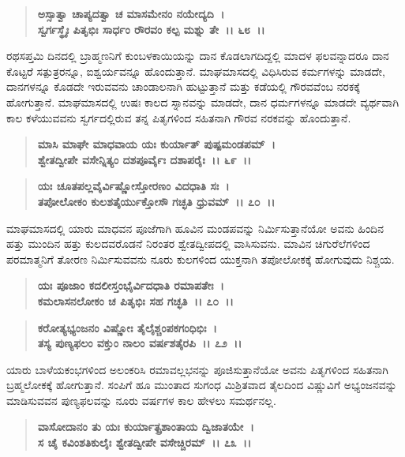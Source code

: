 \begin{verse}
\textbf{ಅಸ್ಸಾತ್ವಾ ಚಾಪ್ಯದತ್ವಾ ಚ ಮಾಸಮೇನಂ ನಯೇದ್ಯದಿ~।}\\\textbf{ಸ್ವರ್ಗಸ್ಥೈಃ ಪಿತೃಭಿಃ ಸಾರ್ಧಂ ರೌರವಂ ಕಲ್ಪ ಮಶ್ನು ತೇ~।। ೬೮~।।}
\end{verse}

ರಥಸಪ್ತಮಿ ದಿನದಲ್ಲಿ ಬ್ರಾಹ್ಮಣನಿಗೆ ಕುಂಬಳಕಾಯಿಯನ್ನು ದಾನ ಕೊಡಲಾಗದಿದ್ದಲ್ಲಿ ಮಾದಳ ಫಲವನ್ನಾದರೂ ದಾನ ಕೊಟ್ಟರೆ ಸತ್ಪುತ್ರರನ್ನೂ, ಐಶ್ವರ್ಯವನ್ನೂ ಹೊಂದುತ್ತಾನೆ. ಮಾಘಮಾಸದಲ್ಲಿ ವಿಧಿಸಿರುವ ಕರ್ಮಗಳನ್ನು ಮಾಡದೇ, ದಾನಗಳನ್ನೂ ಕೊಡದೇ ಇರುವವನು ಚಾಂಡಾಲನಾಗಿ ಹುಟ್ಟುತ್ತಾನೆ ಮತ್ತು ಕಡೆಯಲ್ಲಿ ಗೌರವವೆಂಬ ನರಕಕ್ಕೆ ಹೋಗುತ್ತಾನೆ. ಮಾಘಮಾಸದಲ್ಲಿ ಉಷಃ ಕಾಲದ ಸ್ನಾನವನ್ನು ಮಾಡದೇ, ದಾನ ಧರ್ಮಗಳನ್ನೂ ಮಾಡದೇ ವ್ಯರ್ಥವಾಗಿ ಕಾಲ ಕಳೆಯುವವನು ಸ್ವರ್ಗದಲ್ಲಿರುವ ತನ್ನ ಪಿತೃಗಳಿಂದ ಸಹಿತನಾಗಿ ಗೌರವ ನರಕವನ್ನು ಹೊಂದುತ್ತಾನೆ.

\begin{verse}
\textbf{ಮಾಸಿ ಮಾಘೇ ಮಾಧವಾಯ ಯಃ ಕುರ್ಯಾತ್ ಪುಷ್ಪಮಂಡಪಮ್~।}\\\textbf{ಶ್ವೇತದ್ವೀಪೇ ವಸೇನ್ನಿತ್ಯಂ ದಶಪೂರ್ವೈಃ ದಶಾಪರೈಃ~।। ೬೯~।।}
\end{verse}

\begin{verse}
\textbf{ಯಃ ಚೂತಪಲ್ಲವೈರ್ವಿಷ್ಣೋಸ್ತೋರಣಂ ವಿದಧಾತಿ ಸಃ~।}\\\textbf{ತಪೋಲೋಕಂ ಕುಲಶತೈರ್ಯುಕ್ತೋಸೌ ಗಚ್ಛತಿ ಧ್ರುವಮ್~।। ೭೦~।।}
\end{verse}

ಮಾಘಮಾಸದಲ್ಲಿ ಯಾರು ಮಾಧವನ ಪೂಜೆಗಾಗಿ ಹೂವಿನ ಮಂಡಪವನ್ನು ನಿರ್ಮಿಸುತ್ತಾನೆಯೋ ಅವನು ಹಿಂದಿನ ಹತ್ತು ಮುಂದಿನ ಹತ್ತು ಕುಲದವರೊಡನೆ ನಿರಂತರ ಶ್ವೇತದ್ವೀಪದಲ್ಲಿ ವಾಸಿಸುವನು. ಮಾವಿನ ಚಿಗುರೆಲೆಗಳಿಂದ ಪರಮಾತ್ಮನಿಗೆ ತೋರಣ ನಿರ್ಮಿಸುವವನು ನೂರು ಕುಲಗಳಿಂದ ಯುಕ್ತನಾಗಿ ತಪೋಲೋಕಕ್ಕೆ ಹೋಗುವುದು ನಿಶ್ಚಯ.

\begin{verse}
\textbf{ಯಃ ಪೂಜಾಂ ಕದಲೀಸ್ತಂಭೈರ್ವಿದಧಾತಿ ರಮಾಪತೇಃ~।}\\\textbf{ಕಮಲಾಸನಲೋಕಂ ಚ ಪಿತೃಭಿಃ ಸಹ ಗಚ್ಛತಿ~।। ೭೦~।। }
\end{verse}

\begin{verse}
\textbf{ಕರೋತ್ಯಭ್ಯಂಜನಂ ವಿಷ್ಣೋಃ ತೈಲೈಶ್ಚಂಪಕಗಂಧಿಭಿಃ~।}\\\textbf{ತಸ್ಯ ಪುಣ್ಯಫಲಂ ವಕ್ತುಂ ನಾಲಂ ವರ್ಷಶತೈರಪಿ~।। ೭೨~।।}
\end{verse}

ಯಾರು ಬಾಳೆಯಕಂಭಗಳಿಂದ ಅಲಂಕರಿಸಿ ರಮಾವಲ್ಲಭನನ್ನು ಪೂಜಿಸುತ್ತಾನೆಯೋ ಅವನು ಪಿತೃಗಳಿಂದ ಸಹಿತನಾಗಿ ಬ್ರಹ್ಮಲೋಕಕ್ಕೆ ಹೋಗುತ್ತಾನೆ. ಸಂಪಿಗೆ ಹೂ ಮುಂತಾದ ಸುಗಂಧ ಮಿಶ್ರಿತವಾದ ತೈಲದಿಂದ ವಿಷ್ಣುವಿಗೆ ಅಭ್ಯಂಜನವನ್ನು ಮಾಡಿಸುವವನ ಪುಣ್ಯಫಲವನ್ನು ನೂರು ವರ್ಷಗಳ ಕಾಲ ಹೇಳಲು ಸಮರ್ಥನಲ್ಲ.

\begin{verse}
\textbf{ವಾಸೋದಾನಂ ತು ಯಃ ಕುರ್ಯಾತ್ಪ್ರಶಾಂತಾಯ ದ್ವಿಜಾತಯೇ~।}\\\textbf{ಸ ಚೈ ಕವಿಂಶತಿಕುಲೈಃ ಶ್ವೇತದ್ವೀಪೇ ವಸೇಚ್ಚಿರಮ್~।। ೭೩~।। }
\end{verse}

